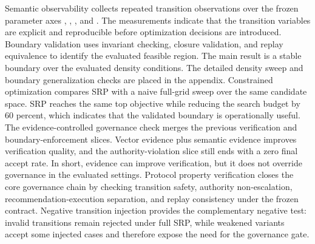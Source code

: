 \markdownRendererUlEndTight \markdownRendererInterblockSeparator
{}\markdownRendererInterblockSeparator
{}\markdownRendererInterblockSeparator
{}\markdownRendererSectionBegin
{}\markdownRendererInterblockSeparator
{}\markdownRendererInterblockSeparator
{}\markdownRendererInterblockSeparator
{}Semantic observability collects repeated transition observations over the frozen parameter axes , , , and . The measurements indicate that the transition variables are explicit and reproducible before optimization decisions are introduced.\markdownRendererParagraphSeparator
{}Boundary validation uses invariant checking, closure validation, and replay equivalence to identify the evaluated feasible region. The main result is a stable boundary over the evaluated density conditions. The detailed density sweep and boundary generalization checks are placed in the appendix.\markdownRendererParagraphSeparator
{}Constrained optimization compares SRP with a naive full-grid sweep over the same candidate space. SRP reaches the same top objective while reducing the search budget by 60 percent, which indicates that the validated boundary is operationally useful.\markdownRendererParagraphSeparator
{}The evidence-controlled governance check merges the previous verification and boundary-enforcement slices. Vector evidence plus semantic evidence improves verification quality, and the authority-violation slice still ends with a zero final accept rate. In short, evidence can improve verification, but it does not override governance in the evaluated settings.\markdownRendererParagraphSeparator
{}Protocol property verification closes the core governance chain by checking transition safety, authority non-escalation, recommendation-execution separation, and replay consistency under the frozen contract. Negative transition injection provides the complementary negative test: invalid transitions remain rejected under full SRP, while weakened variants accept some injected cases and therefore expose the need for the governance gate.\markdownRendererParagraphSeparator
